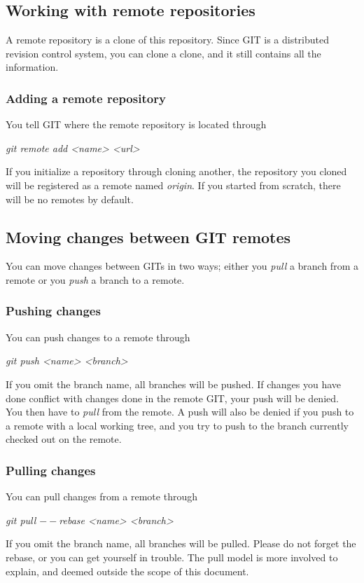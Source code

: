 \documentclass[twoside, 11pt, a4paper]{article}
\begin{document}
\subsection*{Working with remote repositories}
A remote repository is a clone of this repository. Since GIT is
a distributed revision control system, you can clone a clone, and
it still contains all the information.

\subsubsection*{Adding a remote repository}
You tell GIT where the remote repository is located through \\
\begin{center}\emph{git remote add <name> <url>}\end{center}
If you initialize a repository through cloning another, the
repository you cloned will be registered as a remote named \emph{origin}.
If you started from scratch, there will be no remotes by default.
\subsection*{Moving changes between GIT remotes}
You can move changes between GITs in two ways; either you \emph{pull}
a branch from a remote or you \emph{push} a branch to a remote.

\subsubsection*{Pushing changes}
You can push changes to a remote through \\
\begin{center}\emph{git push <name> <branch>}\end{center}
If you omit the branch name, all branches will be pushed.
If changes you have done conflict with changes done in the remote
GIT, your push will be denied. You then have to \emph{pull} from the remote.
A push will also be denied if you push to a remote with a local working tree,
and you try to push to the branch currently checked out on the remote.

\subsubsection*{Pulling changes}
You can pull changes from a remote through \\
\begin{center}\emph{git pull $--$rebase <name> <branch>}\end{center}
If you omit the branch name, all branches will be pulled.
Please do not forget the rebase, or you can get yourself in trouble.
The pull model is more involved to explain,
and deemed outside the scope of this document.
\end{document}
